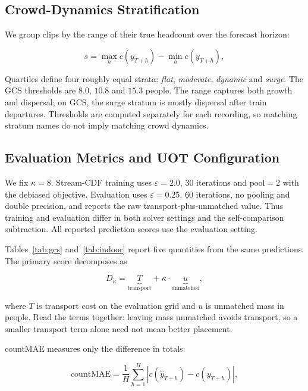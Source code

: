 \documentclass{article}
\begin{document}
\subsection{Crowd-Dynamics Stratification}
\label{sec:setup-strata}

We group clips by the range of their true headcount over the forecast horizon:

\begin{equation}
\label{eq:stratum}
s = \max_h c(y_{T+h}) - \min_h c(y_{T+h}),
\end{equation}

Quartiles define four roughly equal strata: \emph{flat}, \emph{moderate}, \emph{dynamic} and \emph{surge}. The GCS thresholds are $8.0$, $10.8$ and $15.3$ people. The range captures both growth and dispersal; on GCS, the surge stratum is mostly dispersal after train departures. Thresholds are computed separately for each recording, so matching stratum names do not imply matching crowd dynamics.

\subsection{Evaluation Metrics and UOT Configuration}
\label{sec:setup-metrics}

We fix $\kappa = 8$. Stream-CDF training uses $\varepsilon = 2.0$, 30 iterations and $\text{pool} = 2$ with the debiased objective. Evaluation uses $\varepsilon = 0.25$, 60 iterations, no pooling and double precision, and reports the raw transport-plus-unmatched value. Thus training and evaluation differ in both solver settings and the self-comparison subtraction. All reported prediction scores use the evaluation setting.

Tables~\ref{tab:gcs} and~\ref{tab:indoor} report five quantities from the same predictions. The primary score decomposes as

\begin{equation}
\label{eq:decomposition}
D_\kappa = \underbrace{T}_{\text{transport}} + \kappa \cdot \underbrace{u}_{\text{unmatched}},
\end{equation}

where $T$ is transport cost on the evaluation grid and $u$ is unmatched mass in people. Read the terms together: leaving mass unmatched avoids transport, so a smaller transport term alone need not mean better placement.

countMAE measures only the difference in totals:

\begin{equation}
\label{eq:countmae}
\mathrm{countMAE} = \frac{1}{H} \sum_{h=1}^{H} \left| c(\hat{y}_{T+h}) - c(y_{T+h}) \right|,
\end{equation}
\end{document}
